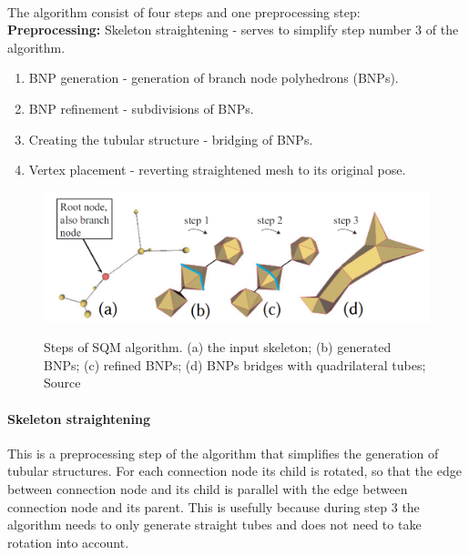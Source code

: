 \paragraph{}
The algorithm consist of four steps and one preprocessing step:\\
\textbf{Preprocessing:} Skeleton straightening - serves to simplify step number 3 of the algorithm.
\begin{enumerate}
	\itemsep-0.25em 
	\item BNP generation - generation of branch node polyhedrons (BNPs).
	\item BNP refinement - subdivisions of BNPs.
	\item Creating the tubular structure - bridging of BNPs.
	\item Vertex placement - reverting straightened mesh to its original pose.
\end{enumerate}

\begin{figure}[h]
    \centering
    \includegraphics[width=\textwidth]{images/sqm_viz.png}
    \label{fig:sqm_algorithm_steps}
    \caption[Steps of SQM algorithm]{Steps of SQM algorithm. (a) the input skeleton; (b) generated BNPs; (c) refined BNPs; (d) BNPs bridges with quadrilateral tubes; Source \cite{sqm}}
\end{figure}

\paragraph{Skeleton straightening}
This is a preprocessing step of the algorithm that simplifies the generation of tubular structures. For each connection node its child is rotated, so that the edge between connection node and its child is parallel with the edge between connection node and its parent. This is usefully because during step 3 the algorithm needs to only generate straight tubes and does not need to take rotation into account.

